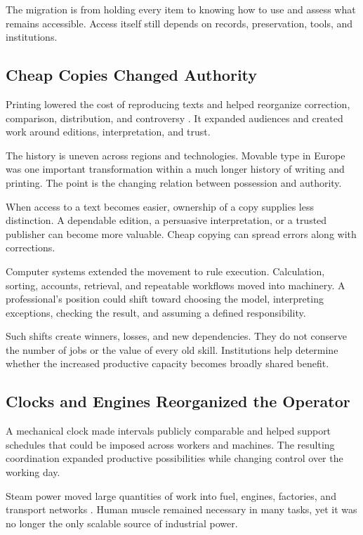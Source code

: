 The migration is from holding every item to knowing how to use and assess what remains accessible. Access itself still depends on records, preservation, tools, and institutions.

\subsection{Cheap Copies Changed Authority}

Printing lowered the cost of reproducing texts and helped reorganize correction, comparison, distribution, and controversy \cite{eisenstein1979printing}. It expanded audiences and created work around editions, interpretation, and trust.

The history is uneven across regions and technologies. Movable type in Europe was one important transformation within a much longer history of writing and printing. The point is the changing relation between possession and authority.

When access to a text becomes easier, ownership of a copy supplies less distinction. A dependable edition, a persuasive interpretation, or a trusted publisher can become more valuable. Cheap copying can spread errors along with corrections.

Computer systems extended the movement to rule execution. Calculation, sorting, accounts, retrieval, and repeatable workflows moved into machinery. A professional's position could shift toward choosing the model, interpreting exceptions, checking the result, and assuming a defined responsibility.

Such shifts create winners, losses, and new dependencies. They do not conserve the number of jobs or the value of every old skill. Institutions help determine whether the increased productive capacity becomes broadly shared benefit.

\subsection{Clocks and Engines Reorganized the Operator}

A mechanical clock made intervals publicly comparable and helped support schedules that could be imposed across workers and machines. The resulting coordination expanded productive possibilities while changing control over the working day.

Steam power moved large quantities of work into fuel, engines, factories, and transport networks \cite{landes1969unbound}. Human muscle remained necessary in many tasks, yet it was no longer the only scalable source of industrial power.

